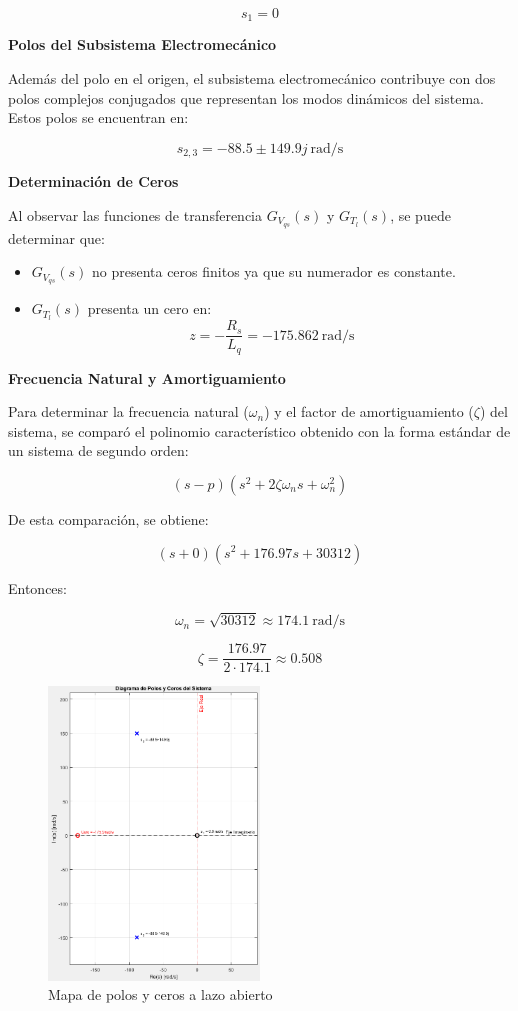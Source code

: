 \documentclass{article}
\begin{document}
\[
s_1 = 0
\]

\textbf{Polos del Subsistema Electromecánico}

Además del polo en el origen, el subsistema electromecánico contribuye con dos polos complejos conjugados que representan los modos dinámicos del sistema. Estos polos se encuentran en:

\[
s_{2,3} = -88.5 \pm 149.9j \ \text{rad/s}
\]

\textbf{Determinación de Ceros}

Al observar las funciones de transferencia \( G_{V_{qs}}(s) \) y \( G_{T_l}(s) \), se puede determinar que:

\begin{itemize}
    \item \( G_{V_{qs}}(s) \) no presenta ceros finitos ya que su numerador es constante.
    \item \( G_{T_l}(s) \) presenta un cero en:
    \[
    z = -\frac{R_s}{L_q} = -175.862 \ \text{rad/s}
    \]
\end{itemize}

\textbf{Frecuencia Natural y Amortiguamiento}

Para determinar la frecuencia natural (\( \omega_n \)) y el factor de amortiguamiento (\( \zeta \)) del sistema, se comparó el polinomio característico obtenido con la forma estándar de un sistema de segundo orden:

\[
(s - p)(s^2 + 2\zeta\omega_n s + \omega_n^2)
\]

De esta comparación, se obtiene:

\[
(s + 0)(s^2 + 176.97s + 30312) 
\]

Entonces:

\[
\omega_n = \sqrt{30312} \approx 174.1 \ \text{rad/s}
\]

\[
\zeta = \frac{176.97}{2 \cdot 174.1} \approx 0.508
\]

\begin{figure}[H]
    \centering
    \includegraphics[width=0.5\textwidth]{Imagenes/mapa_polos_ceros.png}
    \caption{Mapa de polos y ceros a lazo abierto}
    \label{fig:polos_ceros}
\end{figure}
\end{document}
